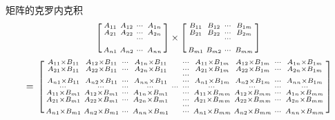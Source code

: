 \documentclass[twoside,a4paper,CCT]{cctart}   %
\begin{document}
\begin{define}
矩阵的克罗内克积
\\
   $$\begin{bmatrix}\begin{smallmatrix}
  A_{11}& A_{12}& \cdots&A_{1n}\\
  A_{21}& A_{22}& \cdots&A_{2n}\\
  & & \cdots&\\&\\
  A_{n1}& A_{n2}& \cdots&A_{nn}\\
 \end{smallmatrix}\end{bmatrix}
 \times
 \begin{bmatrix}\begin{smallmatrix}
  B_{11}& B_{12}& \cdots&B_{1m}\\
  B_{21}& B_{22}& \cdots&B_{2m}\\
  & & \cdots&\\&\\
  B_{m1}& B_{m2}& \cdots&B_{mm}\\
 \end{smallmatrix}\end{bmatrix}\\$$
 $$=\\
 \begin{bmatrix}\begin{smallmatrix}
  A_{11} \times B_{11}& A_{12} \times B_{11}& \cdots&A_{1n} \times B_{11}
  & & \cdots&
  A_{11} \times B_{1m}& A_{12} \times B_{1m}& \cdots&A_{1n} \times B_{1m}\\
  A_{21} \times B_{11}& A_{22} \times B_{11}& \cdots&A_{2n} \times B_{11}
  & & \cdots&
  A_{21} \times B_{1m}& A_{22} \times B_{1m}& \cdots&A_{2n} \times B_{1m}\\
  & & & & &\cdots& &\\
  A_{n1} \times B_{11}& A_{n2} \times B_{11}& \cdots&A_{nn} \times B_{11}
  & & \cdots&
  A_{n1} \times B_{1m}& A_{n2} \times B_{1m}& \cdots&A_{nn} \times B_{1m}\\
  \cdots &\cdots &\cdots &\cdots &\cdots  &\cdots  &\cdots &\cdots  &\cdots &\cdots \\
  A_{11} \times B_{m1}& A_{12} \times B_{m1}& \cdots&A_{1n} \times B_{m1}
  & & \cdots&
  A_{11} \times B_{mm}& A_{12} \times B_{mm}& \cdots&A_{1n} \times B_{mm}\\
  A_{21} \times B_{m1}& A_{22} \times B_{m1}& \cdots&A_{2n} \times B_{m1}
  & & \cdots&
  A_{21} \times B_{mm}& A_{22} \times B_{mm}& \cdots&A_{2n} \times B_{mm}\\
  & & & & &\cdots& &\\
  A_{n1} \times B_{m1}& A_{n2} \times B_{m1}& \cdots&A_{nn} \times B_{m1}
  & & \cdots&
  A_{n1} \times B_{mm}& A_{n2} \times B_{mm}& \cdots&A_{nn} \times B_{mm}\\
  \end{smallmatrix}\end{bmatrix}$$
\end{define}
\end{document}
